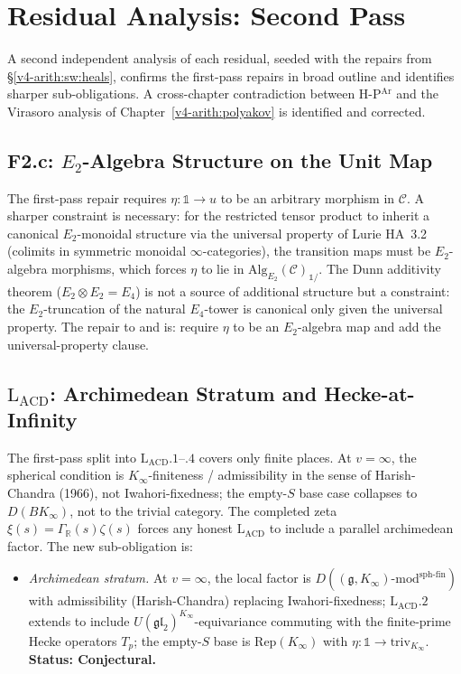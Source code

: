 \section{Residual Analysis: Second Pass}
\label{v4-arith:sw:wave2}

A second independent analysis of each residual, seeded with the
repairs from \S\ref{v4-arith:sw:heals}, confirms the first-pass
repairs in broad outline and identifies sharper sub-obligations.
A cross-chapter contradiction between H-P\(^{\mathrm{Ar}}\) and the
Virasoro analysis of Chapter~\ref{v4-arith:polyakov} is identified
and corrected.

\subsection{F2.c: \texorpdfstring{\(E_{2}\)}{E2}-Algebra Structure on the Unit Map}

The first-pass repair requires \(\eta:\mathbb{1}\to u\) to be an
arbitrary morphism in \(\mathcal{C}\). A sharper constraint is
necessary: for the restricted tensor product to inherit a canonical
\(E_{2}\)-monoidal structure via the universal property of Lurie
HA~3.2 (colimits in symmetric monoidal \(\infty\)-categories), the
transition maps must be \(E_{2}\)-algebra morphisms, which forces
\(\eta\) to lie in \(\mathrm{Alg}_{E_{2}}(\mathcal{C})_{\mathbb{1}/}\).
The Dunn additivity theorem (\(E_{2}\otimes E_{2}=E_{4}\)) is not a
source of additional structure but a constraint: the \(E_{2}\)-truncation
of the natural \(E_{4}\)-tower is canonical only given the universal
property. The repair to  and
 is: require \(\eta\) to be an
\(E_{2}\)-algebra map and add the universal-property clause.

\subsection{\texorpdfstring{\(\mathrm{L}_{\mathrm{ACD}}\)}{L-ACD}: Archimedean Stratum and Hecke-at-Infinity}

The first-pass split into \(\mathrm{L}_{\mathrm{ACD}}.1\)--\(.4\)
covers only finite places. At \(v=\infty\), the spherical condition
is \(K_{\infty}\)-finiteness / admissibility in the sense of
Harish-Chandra (1966), not Iwahori-fixedness; the empty-\(S\) base
case collapses to \(D(BK_{\infty})\), not to the trivial category.
The completed zeta \(\xi(s)=\Gamma_{\mathbb{R}}(s)\zeta(s)\) forces
any honest \(\mathrm{L}_{\mathrm{ACD}}\) to include a parallel
archimedean factor. The new sub-obligation is:
\begin{itemize}
\item[(\(\mathrm{L}_{\mathrm{ACD}}.0\))] \emph{Archimedean stratum.}
At \(v=\infty\), the local factor is
\(D((\mathfrak{g},K_{\infty})\text{-mod}^{\mathrm{sph\text{-}fin}})\)
with admissibility (Harish-Chandra) replacing Iwahori-fixedness;
\(\mathrm{L}_{\mathrm{ACD}}.2\) extends to include
\(U(\mathfrak{gl}_{2})^{K_{\infty}}\)-equivariance commuting with
the finite-prime Hecke operators \(T_{p}\); the empty-\(S\) base is
\(\mathrm{Rep}(K_{\infty})\) with
\(\eta:\mathbb{1}\to\mathrm{triv}_{K_{\infty}}\).
\textbf{Status: Conjectural.}
\end{itemize}

